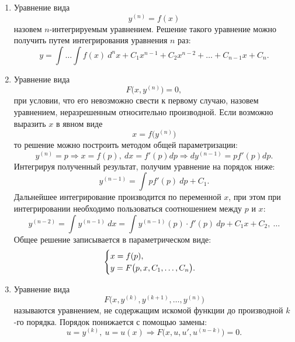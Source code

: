     \begin{enumerate}
        \item Уравнение вида
            \[
                y^{(n)} = f(x)
            \]
            назовем $ n $-интегрируемым уравнением. Решение такого уравнение можно получить путем интегрирования уравнения $ n $ раз:
            \[
                y = \int \dots \int f(x) ~ d^n x + C_1 x^{n - 1} + C_2 x^{n - 2} + \dots + C_{n - 1} x + C_n.
            \]

        \item Уравнение вида
            \[
                F \Big( x, y^{(n)} \Big) = 0,
            \]
            при условии, что его невозможно свести к первому случаю, назовем уравнением, неразрешенным относительно производной. Если возможно выразить $ x $ в явном виде
            \[
                x = f \Big( y^{(n)} \Big)
            \]
            то решение можно построить методом общей параметризации:
            \[
                y^{(n)} = p \Longrightarrow x = f(p), ~ dx = f'(p) dp \Longrightarrow dy^{(n - 1)} = p f'(p) dp.
            \]
            Интегрируя полученный результат, получим уравнение на порядок ниже:
            \[
                y^{(n - 1)} = \int p f'(p) ~ dp + C_1.
            \]
            Дальнейшее интегрирование производится по переменной $ x $, при этом при интегрировании необходимо пользоваться соотношением между $ p $ и $ x $:
            \[
                y^{(n - 2)} = \int y^{(n - 1)} ~ dx = \int y^{(n - 1)}(p) \cdot f'(p) ~ dp + C_1x + C_2, ~ \dots
            \]
            Общее решение записывается в параметрическом виде:
            \[
                \begin{cases}
                    x = f(p), \\
                    y = F \bigl( p, x, C_1, \dots, C_n \bigr).
                \end{cases}
            \]

        \item Уравнение вида
            \[
                F \Big( x, y^{(k)}, y^{(k + 1)}, \dots, y^{(n)} \Big)
            \]
            называются уравнением, не содержащим искомой функции до производной $ k $-го порядка. Порядок понижается с помощью замены:
            \[
                u = y^{(k)}, ~ u = u(x) \Longrightarrow F \Big( x, u, u', u^{(n - k)} \Big) = 0.
            \]


\end{enumerate}
